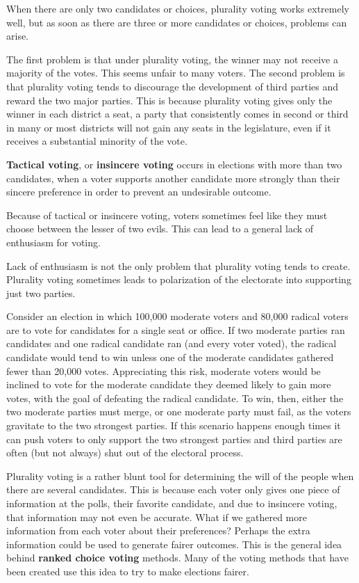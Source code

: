 \newpage

When there are only two candidates or choices, plurality voting works
extremely well, but as soon as there are three or more candidates or
choices, problems can arise.

The first problem is that under plurality voting, the winner may not
receive a majority of the votes. This seems unfair to many voters. The
second problem is that plurality voting tends to discourage the
development of third parties and reward the two major parties. This is
because plurality voting gives only the winner in each district a
seat, a party that consistently comes in second or third in many or
most districts will not gain any seats in the legislature, even if it
receives a substantial minority of the vote.

\begin{definition}
  \textbf{Tactical voting}, or \textbf{insincere voting} occurs in
  elections with more than two candidates, when a voter supports
  another candidate more strongly than their sincere preference in
  order to prevent an undesirable outcome.
\end{definition}

Because of tactical or insincere voting, voters sometimes feel like
they must choose between the lesser of two evils. This can lead to a
general lack of enthusiasm for voting.

Lack of enthusiasm is not the only problem that plurality voting tends
to create. Plurality voting sometimes leads to polarization of the
electorate into supporting just two parties.

Consider an election in which 100,000 moderate voters and 80,000
radical voters are to vote for candidates for a single seat or office.
If two moderate parties ran candidates and one radical candidate ran
(and every voter voted), the radical candidate would tend to win
unless one of the moderate candidates gathered fewer than 20,000
votes. Appreciating this risk, moderate voters would be inclined to
vote for the moderate candidate they deemed likely to gain more votes,
with the goal of defeating the radical candidate. To win, then, either
the two moderate parties must merge, or one moderate party must fail,
as the voters gravitate to the two strongest parties. If this scenario
happens enough times it can push voters to only support the two
strongest parties and third parties are often (but not always) shut
out of the electoral process.

Plurality voting is a rather blunt tool for determining the will of
the people when there are several candidates. This is because each
voter only gives one piece of information at the polls, their favorite
candidate, and due to insincere voting, that information may not even
be accurate. What if we gathered more information from each voter
about their preferences? Perhaps the extra information could be used
to generate fairer outcomes. This is the general idea behind
\textbf{ranked choice voting} methods. Many of the voting methods that
have been created use this idea to try to make elections fairer.

